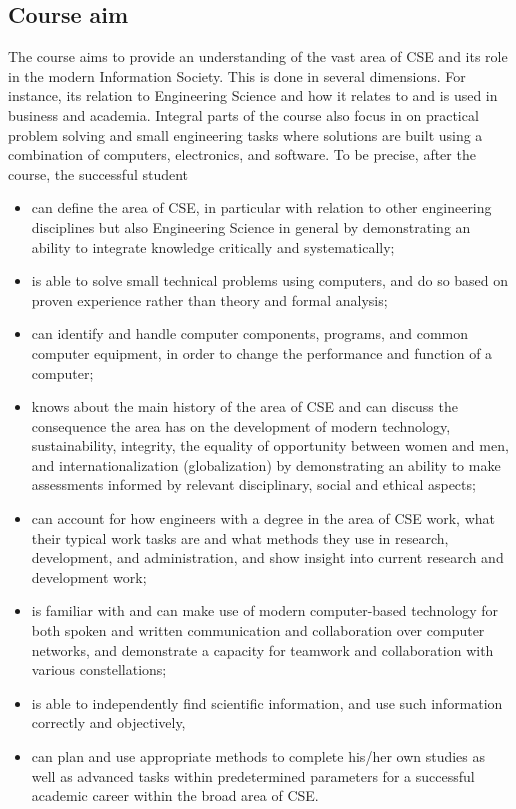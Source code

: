 \documentclass[conference]{IEEEtran}
\begin{document}
\subsection{Course aim}
The course aims to provide an understanding of the vast area of CSE and its role in the modern Information Society. This is done in several dimensions. For instance, its relation to Engineering Science and how it relates to and is used in business and academia. Integral parts of the course also focus in on practical problem solving and small engineering tasks where solutions are built using a combination of computers, electronics, and software. 
To be precise, after the course, the successful student
\begin{itemize}
  \item can define the area of CSE, in particular with relation to other engineering disciplines but also 
    Engineering Science in general by demonstrating an ability to integrate knowledge critically and 
    systematically; 

  \item is able to solve small technical problems using computers, and do so based on proven experience 
    rather than theory and formal analysis;

  \item can identify and handle computer components, programs, and common computer equipment, in 
    order to change the performance and function of a computer;

  \item knows about the main history of the area of CSE and can discuss the consequence the area has on 
    the development of modern technology, sustainability, integrity, the equality of opportunity between 
    women and men, and internationalization (globalization) by demonstrating an ability to make 
    assessments informed by relevant disciplinary, social and ethical aspects;

  \item can account for how engineers with a degree in the area of CSE work, what their typical work
    tasks are and what methods they use in research, development, and administration, and show 
    insight into current research and development work;

  \item is familiar with and can make use of modern computer-based technology for both spoken and
    written communication and collaboration over computer networks, and demonstrate a capacity for 
    teamwork and collaboration with various constellations;

  \item is able to independently find scientific information, and use such information correctly and 
    objectively,

  \item can plan and use appropriate methods to complete his/her own studies as well as advanced tasks 
    within predetermined parameters for a successful academic career within the broad area of CSE.
\end{itemize}
\end{document}
